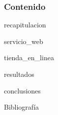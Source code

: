 \documentclass{beamer}
\begin{document}
  {
  \frame{\titlepage}}

  \begin{frame}
    \frametitle{Contenido}
    \setcounter{tocdepth}{1}
    \tableofcontents
  \end{frame}

  \setlength{\parskip}{0.5em}

  
    {recapitulacion}
  
  
    {servicio_web}
  
  
    {tienda_en_linea}
  
  
    {resultados}
  
  
    {conclusiones}

  \begin{frame}[allowframebreaks]{Bibliografía}
    \printbibliography
  \end{frame}

  \setlength{\parskip}{0.0em}

  {
  \frame{\titlepage}}
\end{document}
